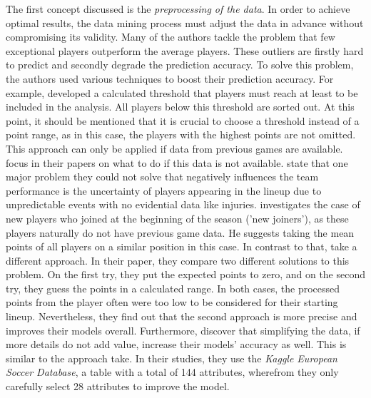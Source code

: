 \indent The first concept discussed is the \emph{preprocessing of the data}. In order to achieve optimal results, the data mining process must adjust the data in advance without compromising its validity. Many of the authors tackle the problem that few exceptional players outperform the average players. These outliers are firstly hard to predict and secondly degrade the prediction accuracy. To solve this problem, the authors used various techniques to boost their prediction accuracy. For example, \citet{landers_machine_2019} developed a calculated threshold that players must reach at least to be included in the analysis. All players below this threshold are sorted out. At this point, it should be mentioned that it is crucial to choose a threshold instead of a point range, as in this case, the players with the highest points are not omitted. This approach can only be applied if data from previous games are available. \citet{lutz_fantasy_2015,egidi_bayesian_2018,yurko_nflwar_2019} focus in their papers on what to do if this data is not available. \citet{yurko_nflwar_2019} state that one major problem they could not solve that negatively influences the team performance is the uncertainty of players appearing in the lineup due to unpredictable events with no evidential data like injuries. \citet{lutz_fantasy_2015} investigates the case of new players who joined at the beginning of the season ('new joiners'), as these players naturally do not have previous game data. He suggests taking the mean points of all players on a similar position in this case. \parencite[cf.][, p. 3]{lutz_fantasy_2015} In contrast to that, \citet{egidi_bayesian_2018} take a different approach. In their paper, they compare two different solutions to this problem. On the first try, they put the expected points to zero, and on the second try, they guess the points in a calculated range. In both cases, the processed points from the player often were too low to be considered for their starting lineup. Nevertheless, they find out that the second approach is more precise and improves their models overall. Furthermore, \citet{egidi_bayesian_2018} discover that simplifying the data, if more details do not add value, increase their models' accuracy as well. This is similar to the approach \citet{deng_analysis_2020} take. In their studies, they use the \emph{Kaggle European Soccer Database}, a table with a total of 144 attributes, wherefrom they only carefully select 28 attributes to improve the model. \\
